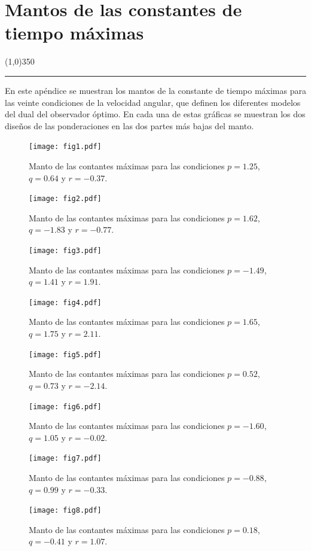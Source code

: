 \documentclass[10pt]{report}
\numberwithin{equation}{chapter}
\numberwithin{algorithm}{chapter}
\begin{document}
\chapter{Mantos de las constantes de tiempo máximas}\label{apen5}
\begin{center}
\line(1,0){350}\\\rule[-.4\baselineskip]{1.0\linewidth}{3.2pt}
\end{center}
\newpage
En este apéndice se muestran los mantos de la constante de tiempo máximas para las veinte condiciones de la velocidad angular, que definen los diferentes modelos del dual del observador óptimo. En cada una de estas gráficas se muestran los dos diseños de las ponderaciones en las dos partes más bajas del manto.
\begin{figure}[h!]
\center
\texttt{[image: fig1.pdf]}
\caption{Manto de las contantes máximas para las condiciones $p=1.25$, $q=0.64$ y $r=-0.37$.}
\end{figure}
\begin{figure}
\center
\texttt{[image: fig2.pdf]}
\caption{Manto de las contantes máximas para las condiciones $p=1.62$, $q=-1.83$ y $r=-0.77$.}
\end{figure}
\begin{figure}
\center
\texttt{[image: fig3.pdf]}
\caption{Manto de las contantes máximas para las condiciones $p=-1.49$, $q=1.41$ y $r=1.91$.}
\end{figure}
\begin{figure}
\center
\texttt{[image: fig4.pdf]}
\caption{Manto de las contantes máximas para las condiciones $p=1.65$, $q=1.75$ y $r=2.11$.}
\end{figure}
\begin{figure}
\center
\texttt{[image: fig5.pdf]}
\caption{Manto de las contantes máximas para las condiciones $p=0.52$, $q=0.73$ y $r=-2.14$.}
\end{figure}
\begin{figure}
\center
\texttt{[image: fig6.pdf]}
\caption{Manto de las contantes máximas para las condiciones $p=-1.60$, $q=1.05$ y $r=-0.02$.}
\end{figure}
\begin{figure}
\center
\texttt{[image: fig7.pdf]}
\caption{Manto de las contantes máximas para las condiciones $p=-0.88$, $q=0.99$ y $r=-0.33$.}
\end{figure}
\begin{figure}
\center
\texttt{[image: fig8.pdf]}
\caption{Manto de las contantes máximas para las condiciones $p=0.18$, $q=-0.41$ y $r=1.07$.}
\end{figure}
\end{document}
